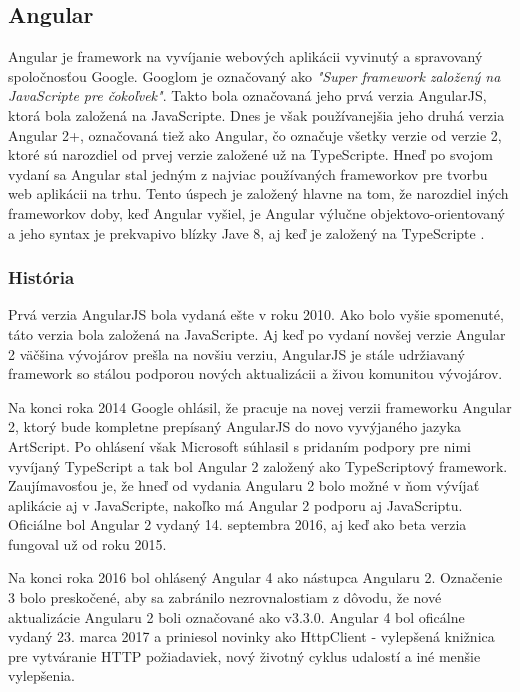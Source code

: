 \subsection{Angular}
\indent Angular je framework na vyvíjanie webových aplikácii vyvinutý a spravovaný spoločnosťou Google. Googlom je označovaný ako \textit{"Super framework založený na JavaScripte pre čokoľvek"}. Takto bola označovaná jeho prvá verzia AngularJS, ktorá bola založená na JavaScripte. Dnes je však používanejšia jeho druhá verzia Angular 2+, označovaná tiež ako Angular, čo označuje všetky verzie od verzie 2, ktoré sú narozdiel od prvej verzie založené už na TypeScripte. Hneď po svojom vydaní sa Angular stal jedným z najviac používaných frameworkov pre tvorbu web aplikácii na trhu. Tento úspech je založený hlavne na tom, že narozdiel iných frameworkov doby, keď Angular vyšiel, je Angular výlučne objektovo-orientovaný a jeho syntax je prekvapivo blízky Jave 8, aj keď je založený na TypeScripte \cite{bakalarska_praca,angular_1,angular_2}. 

\subsubsection{História}
\indent Prvá verzia AngularJS bola vydaná ešte v roku 2010. Ako bolo vyšie spomenuté, táto verzia bola založená na JavaScripte. Aj keď po vydaní novšej verzie Angular 2 väčšina vývojárov prešla na novšiu verziu, AngularJS je stále udržiavaný framework so stálou podporou nových aktualizácii a živou komunitou vývojárov. 

\indent Na konci roka 2014 Google ohlásil, že pracuje na novej verzii frameworku Angular 2, ktorý bude kompletne prepísaný AngularJS do novo vyvýjaného jazyka ArtScript. Po ohlásení však Microsoft súhlasil s pridaním podpory pre nimi vyvíjaný TypeScript a tak bol Angular 2 založený ako TypeScriptový framework. Zaujímavosťou je, že hneď od vydania Angularu 2 bolo možné v ňom vývíjať aplikácie aj v JavaScripte, nakoľko má Angular 2 podporu aj JavaScriptu. Oficiálne bol Angular 2 vydaný 14. septembra 2016, aj keď ako beta verzia fungoval už od roku 2015. 

\indent Na konci roka 2016 bol ohlásený Angular 4 ako nástupca Angularu 2. Označenie 3 bolo preskočené, aby sa zabránilo nezrovnalostiam z dôvodu, že nové aktualizácie Angularu 2 boli označované ako v3.3.0. Angular 4 bol oficálne vydaný 23. marca 2017 a priniesol novinky ako HttpClient - vylepšená knižnica pre vytváranie HTTP požiadaviek, nový životný cyklus udalostí a iné menšie vylepšenia. 

